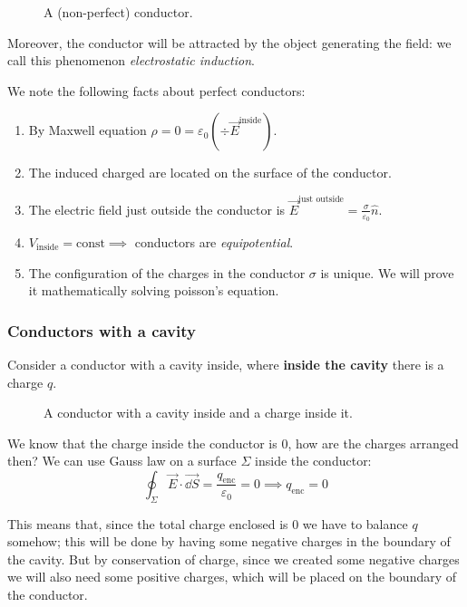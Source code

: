 \documentclass[12pt]{extarticle}
\begin{document}
\begin{figure}[H]
    \centering
    
    \caption{A (non-perfect) conductor.}
\end{figure}

Moreover, the conductor will be attracted by the object generating the field: we call this phenomenon \emph{electrostatic induction}.

We note the following facts about perfect conductors:
\begin{enumerate}
    \item By Maxwell equation $\rho = 0 = \varepsilon_0 (\div \vec E^\text{inside})$.
    \item The induced charged are located on the surface of the conductor.
    \item The electric field just outside the conductor is $\vec E^\text{just outside} = \frac{\sigma}{\varepsilon_0} \hat n$.
    \item $V_\text{inside} = \text{const} \implies$ conductors are \emph{equipotential}.
    \item The configuration of the charges in the conductor $\sigma$ is unique.
          We will prove it mathematically solving poisson's equation.
\end{enumerate}

\subsubsection{Conductors with a cavity}

Consider a conductor with a cavity inside, where \textbf{inside the cavity} there is a charge $q$.

\begin{figure}[H]
    \centering
    
    \caption{A conductor with a cavity inside and a charge inside it.}
\end{figure}

We know that the charge inside the conductor is $0$, how are the charges arranged then?
We can use Gauss law on a surface $\Sigma$ inside the conductor:
\begin{equation}
    \oint_\Sigma \vec E \cdot \vec{\dd{S}} = \frac{q_\text{enc}}{\varepsilon_0} = 0 \implies q_\text{enc} = 0
\end{equation}

This means that, since the total charge enclosed is $0$ we have to balance $q$ somehow; this will be done by having some negative charges in the boundary of the cavity.
But by conservation of charge, since we created some negative charges we will also need some positive charges, which will be placed on the boundary of the conductor.
\end{document}
